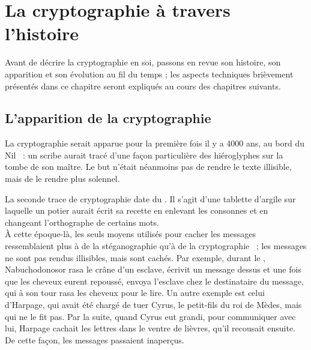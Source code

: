 \chapter{La cryptographie à travers l'histoire\label{chap:Histoire}}
\thispagestyle{empty}
Avant de décrire la cryptographie en soi, passons en revue
son histoire, son apparition et son évolution au fil du temps ; les
aspects techniques brièvement présentés dans ce chapitre seront
expliqués au cours des chapitres suivants.

\section{L'apparition de la cryptographie}
La cryptographie serait apparue pour la première fois il y a 4000 ans,
au bord du Nil ~: un scribe aurait tracé d'une façon particulière des
hiéroglyphes sur la tombe de son maître. Le but n'était néanmoins
pas de rendre le texte illisible, mais de le rendre plus solennel.

La seconde trace de cryptographie date du . Il s'agit d'une tablette
d'argile sur laquelle un potier aurait écrit sa recette en enlevant
les consonnes et en changeant l'orthographe de certains mots. \\

À cette époque-là, les seuls moyens utilisés pour cacher les messages
ressemblaient plus à de la stéganographie qu'à de la cryptographie
~;
les messages ne sont pas rendus illisibles, mais sont cachés. Par
exemple, durant le , Nabuchodonosor rasa le crâne d'un
esclave, écrivit un message dessus et une fois que les cheveux
eurent repoussé, envoya l'esclave chez le destinataire du message,
qui à son tour rasa les cheveux pour le lire. Un autre exemple est celui
d'Harpage, qui avait été chargé de tuer Cyrus, le petit-fils du roi de
Mèdes, mais qui ne le fit pas. Par la suite, quand Cyrus eut
grandi,
pour communiquer avec lui, Harpage cachait les lettres dans le ventre
de lièvres, qu'il recousait ensuite. De cette façon, les messages
passaient
inaperçus. \\

